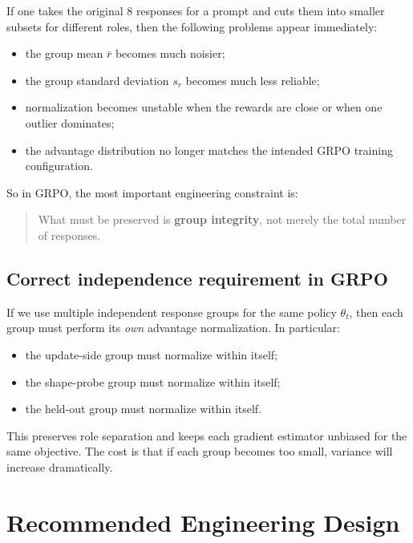 \documentclass[11pt,a4paper]{article}
\begin{document}
If one takes the original 8 responses for a prompt and cuts them into smaller subsets for different roles, then the following problems appear immediately:
\begin{itemize}[leftmargin=2em]
    \item the group mean $\bar r$ becomes much noisier;
    \item the group standard deviation $s_r$ becomes much less reliable;
    \item normalization becomes unstable when the rewards are close or when one outlier dominates;
    \item the advantage distribution no longer matches the intended GRPO training configuration.
\end{itemize}
So in GRPO, the most important engineering constraint is:
\begin{quote}
What must be preserved is \textbf{group integrity}, not merely the total number of responses.
\end{quote}

\subsection{Correct independence requirement in GRPO}
If we use multiple independent response groups for the same policy $\theta_t$, then each group must perform its \emph{own} advantage normalization. In particular:
\begin{itemize}[leftmargin=2em]
    \item the update-side group must normalize within itself;
    \item the shape-probe group must normalize within itself;
    \item the held-out group must normalize within itself.
\end{itemize}
This preserves role separation and keeps each gradient estimator unbiased for the same objective. The cost is that if each group becomes too small, variance will increase dramatically.

\section{Recommended Engineering Design}
\end{document}
